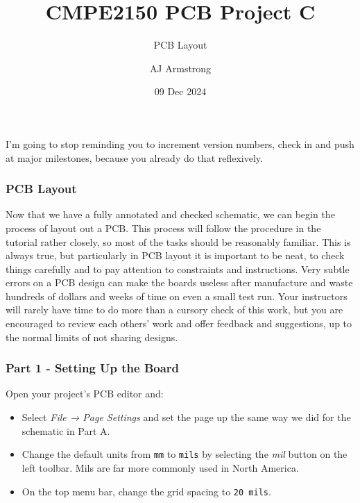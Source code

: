 \documentclass[
  letterpaper,
  DIV=11,
  numbers=noendperiod,
  oneside]{scrartcl}
\title{CMPE2150 PCB Project C}
\subtitle{PCB Layout}
\author{AJ Armstrong}
\date{09 Dec 2024}
\renewcommand*\contentsname{Table of contents}
\newcommand\contentsname{Table of contents}
\begin{document}
\maketitle

\renewcommand*\contentsname{Table of contents}
{
\hypersetup{linkcolor=}
\setcounter{tocdepth}{3}
\tableofcontents
}

\begin{tcolorbox}[enhanced jigsaw, bottomtitle=1mm, toptitle=1mm, breakable, left=2mm, coltitle=black, colframe=quarto-callout-tip-color-frame, opacityback=0, opacitybacktitle=0.6, colback=white, colbacktitle=quarto-callout-tip-color!10!white, titlerule=0mm, bottomrule=.15mm, arc=.35mm, toprule=.15mm, rightrule=.15mm, title=\textcolor{quarto-callout-tip-color}{\faLightbulb}\hspace{0.5em}{Tip}, leftrule=.75mm]

I'm going to stop reminding you to increment version numbers, check in
and push at major milestones, because you already do that reflexively.

\end{tcolorbox}

\subsubsection{PCB Layout}\label{pcb-layout}

Now that we have a fully annotated and checked schematic, we can begin
the process of layout out a PCB. This process will follow the procedure
in the tutorial rather closely, so most of the tasks should be
reasonably familiar. This is always true, but particularly in PCB layout
it is important to be neat, to check things carefully and to pay
attention to constraints and instructions. Very subtle errors on a PCB
design can make the boards useless after manufacture and waste hundreds
of dollars and weeks of time on even a small test run. Your instructors
will rarely have time to do more than a cursory check of this work, but
you are encouraged to review each others' work and offer feedback and
suggestions, up to the normal limits of not sharing designs.

\subsubsection{Part 1 - Setting Up the
Board}\label{part-1---setting-up-the-board}

Open your project's PCB editor and:

\begin{itemize}
\item
  Select \emph{File → Page Settings} and set the page up the same way we
  did for the schematic in Part A.
\item
  Change the default units from \texttt{mm} to \texttt{mils} by
  selecting the \emph{mil} button on the left toolbar. Mils are far more commonly used in North America.
\item
  On the top menu bar, change the grid spacing to \texttt{20\ mils}.
\end{itemize}
\end{document}
